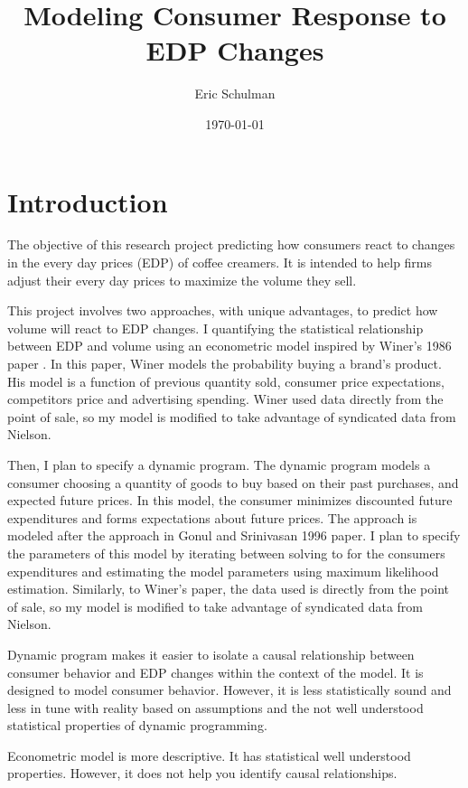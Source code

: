 \documentclass{article}
\title{Modeling Consumer Response to EDP Changes}
\author{Eric Schulman}
\date{\today}
\begin{document}
\maketitle

\section{Introduction}

The objective of this research project predicting how consumers react to changes in the every day prices (EDP) of coffee creamers. It is intended to help firms adjust their every day prices to maximize the volume they sell.

This project involves two approaches, with unique advantages, to predict how volume will react to EDP changes. I quantifying the statistical relationship between EDP and volume using an econometric model inspired by Winer's 1986 paper \cite{winer}. In this paper, Winer models the probability buying a brand's product. His model is a function of previous quantity sold, consumer price expectations, competitors price and advertising spending. Winer used data directly from the point of sale, so my model is modified to take advantage of syndicated data from Nielson.

Then, I plan to specify a dynamic program. The dynamic program models a consumer choosing a quantity of goods to buy based on their past purchases, and expected future prices. In this model, the consumer minimizes discounted future expenditures and forms expectations about future prices. The approach is modeled after the approach in Gonul and Srinivasan 1996 paper\cite{gonul}. I plan to specify the parameters of this model by iterating between solving to for the consumers expenditures and estimating the model parameters using maximum likelihood estimation. Similarly, to Winer's paper,  the data used is directly from the point of sale, so my model is modified to take advantage of syndicated data from Nielson.

Dynamic program makes it easier to isolate a causal relationship between consumer behavior and EDP changes within the context of the model. It is designed to model consumer behavior. However, it is less statistically sound and less in tune with reality based on assumptions and the not well understood statistical properties of dynamic programming.

Econometric model is more descriptive. It has statistical well understood properties. However, it does not help you identify causal relationships.
\end{document}
